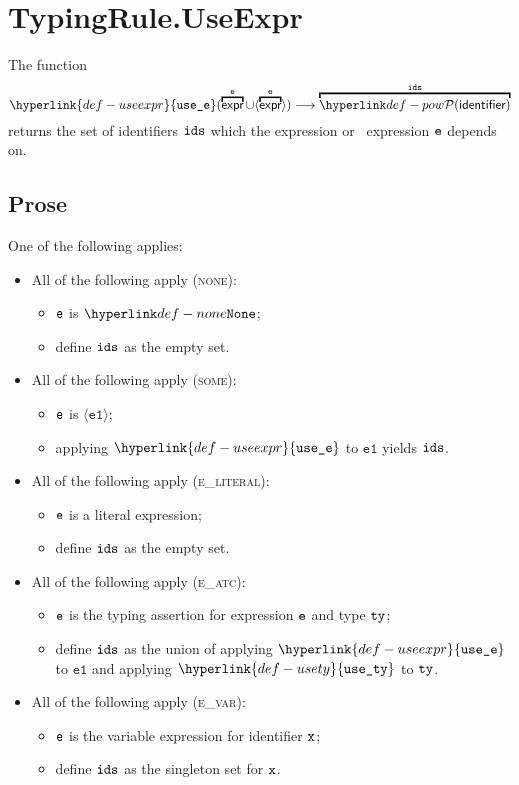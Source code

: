 \documentclass{book}
\newcommand\usety[0]{\hyperlink{def-usety}{\texttt{use\_ty}}}
\newcommand\useexpr[0]{\hyperlink{def-useexpr}{\texttt{use\_e}}}
\newcommand\veone[0]{\texttt{e1}}
\begin{document}
\section{TypingRule.UseExpr \label{sec:TypingRule.UseExpr}}
\hypertarget{def-useexpr}{}
The function
\[
\useexpr(\overname{\expr}{\ve} \cup \langle\overname{\expr}{\ve}\rangle) \aslto \overname{\pow{\identifier}}{\ids}
\]
returns the set of identifiers $\texttt{ids}$ which the expression or \optional\ expression $\texttt{e}$ depends on.

\subsection{Prose}
One of the following applies:
\begin{itemize}
  \item All of the following apply (\textsc{none}):
  \begin{itemize}
    \item $\texttt{e}$ is $\None$;
    \item define $\texttt{ids}$ as the empty set.
  \end{itemize}

  \item All of the following apply (\textsc{some}):
  \begin{itemize}
    \item $\texttt{e}$ is $\langle\veone\rangle$;
    \item applying $\useexpr$ to $\veone$ yields $\texttt{ids}$.
  \end{itemize}

  \item All of the following apply (\textsc{e\_literal}):
  \begin{itemize}
    \item $\texttt{e}$ is a literal expression;
    \item define $\texttt{ids}$ as the empty set.
  \end{itemize}

  \item All of the following apply (\textsc{e\_atc}):
  \begin{itemize}
    \item $\texttt{e}$ is the typing assertion for expression $\texttt{e}$ and type $\texttt{ty}$;
    \item define $\texttt{ids}$ as the union of applying $\useexpr$ to $\veone$ and applying $\usety$ to $\texttt{ty}$.
  \end{itemize}

  \item All of the following apply (\textsc{e\_var}):
  \begin{itemize}
    \item $\texttt{e}$ is the variable expression for identifier $\texttt{x}$;
    \item define $\texttt{ids}$ as the singleton set for $\texttt{x}$.
  \end{itemize}


\end{itemize}
\end{document}
